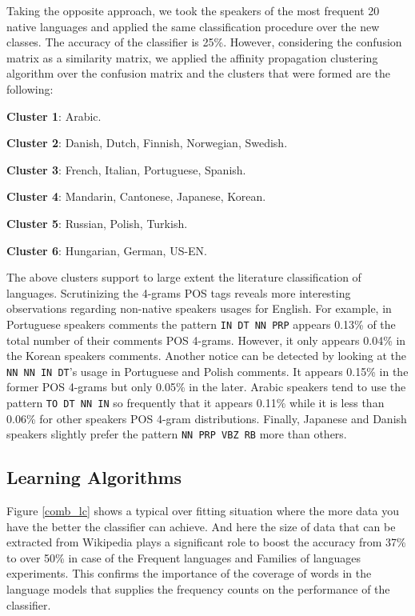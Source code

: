 \documentclass[10pt,a5paper,twoside]{article}
\begin{document}
Taking the opposite approach, we took the speakers of the most frequent 20
native languages and applied the same classification procedure over the new
classes. The accuracy of the classifier is 25\%. However, considering the
confusion matrix as a similarity matrix, we applied the affinity propagation
clustering algorithm \cite{sklearn} over the confusion matrix and the clusters
that were formed are the following:
\begin{compactitem}
\item \textbf{Cluster 1}: Arabic.
\item \textbf{Cluster 2}: Danish, Dutch, Finnish, Norwegian, Swedish.
\item \textbf{Cluster 3}: French, Italian, Portuguese, Spanish.
\item \textbf{Cluster 4}: Mandarin, Cantonese, Japanese, Korean.
\item \textbf{Cluster 5}: Russian, Polish, Turkish.
\item \textbf{Cluster 6}: Hungarian, German, US-EN.
\end{compactitem}

The above clusters support to large extent the literature classification of
languages. Scrutinizing the 4-grams POS tags reveals more interesting
observations regarding non-native speakers usages for English. For example,
in Portuguese speakers comments the pattern \verb+IN DT NN PRP+ appears 0.13\%
of the total number of their comments POS 4-grams. However, it only appears
0.04\% in the Korean speakers comments. Another notice can be detected by
looking at the \verb+NN NN IN DT+'s usage in Portuguese and Polish comments. It
appears 0.15\% in the former POS 4-grams but only 0.05\% in the later. Arabic
speakers tend to use the pattern \verb+TO DT NN IN+ so frequently that it
appears 0.11\% while it is less than 0.06\% for other speakers POS 4-gram
distributions. Finally, Japanese and Danish speakers slightly prefer the pattern
\verb+NN PRP VBZ RB+ more than others.

\subsection{Learning Algorithms}

Figure \ref{comb_lc} shows a typical over fitting situation where the more data
you have the better the classifier can achieve. And here the size of data that
can be extracted from Wikipedia plays a significant role to boost the accuracy
from 37\% to over 50\% in case of the Frequent languages and Families of
languages experiments. This confirms the importance of the coverage of words in
the language models that supplies the frequency counts on the performance of the classifier.
\end{document}
